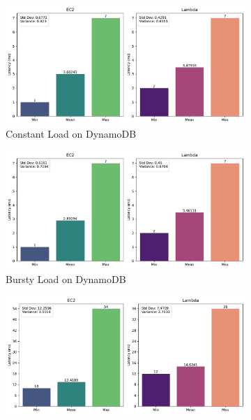 \begin{figure}[h]
	\vfill
	\begin{subfigure}{0.49\linewidth}
		\centering
		\includegraphics[width=\linewidth]{./fig/bar-dynamo-constant.pdf}
		\caption{Constant Load on DynamoDB}
		\label{fig:bar_ddb_const}
	\end{subfigure}
	\hfill
	\begin{subfigure}{0.49\linewidth}
		\centering
		\includegraphics[width=\linewidth]{./fig/bar-dynamo-bursty.pdf}
		\caption{Bursty Load on DynamoDB}
		\label{fig:bar_ddb_bursty}
	\end{subfigure}
	\vfill
	\begin{subfigure}{0.49\linewidth}
		\centering
		\includegraphics[width=\linewidth]{./fig/bar-s3-constant.pdf}

\end{subfigure}
\end{figure}
